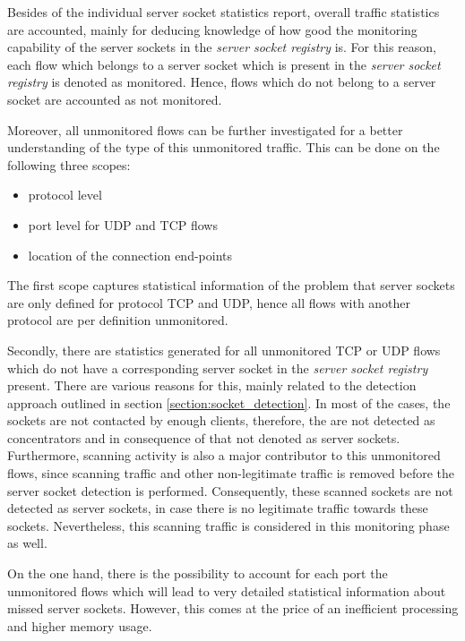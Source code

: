 Besides of the individual \gls{server socket} statistics report, overall traffic 
statistics are accounted, mainly for deducing knowledge of how good the 
monitoring capability of the \glspl{server socket} in the \emph{server socket 
registry} is. For this reason, each flow which belongs to a \gls{server socket} 
which is present in the \emph{server socket registry} is denoted as monitored. 
Hence, flows which do not belong to a \gls{server socket} are accounted as not 
monitored. 

Moreover, all unmonitored flows can be further investigated for a better 
understanding of the type of this unmonitored traffic. This can be done on the 
following three scopes: 
\begin{itemize}
	\item protocol level 
	\item port level for \gls{UDP} and \gls{TCP} flows 
	\item location of the connection end-points 
\end{itemize}

The first scope captures statistical information of the problem that 
\glspl{server socket} are only defined for protocol \gls{TCP} and \gls{UDP}, 
hence all flows with another protocol are per definition unmonitored.

Secondly, there are statistics generated for all unmonitored \gls{TCP} or 
\gls{UDP} flows which do not have a corresponding \gls{server socket} in the 
\emph{server socket registry} present. There are various reasons for this, 
mainly related to the detection approach outlined in section 
\ref{section:socket_detection}. In most of the cases, the sockets are not 
contacted by enough clients, therefore, the are not detected as concentrators 
and in consequence of that not denoted as \glspl{server socket}. Furthermore, 
scanning activity is also a major contributor to this unmonitored flows, since 
scanning traffic and other non-legitimate traffic is removed before the 
\gls{server socket} detection is performed. Consequently, these scanned sockets 
are not detected as \glspl{server socket}, in case there is no legitimate 
traffic towards these sockets. Nevertheless, this scanning traffic is considered 
in this monitoring phase as well. 

On the one hand, there is the possibility to account for each port the 
unmonitored flows which will lead to very detailed statistical information about  
missed \glspl{server socket}. However, this comes at the price of an inefficient 
processing and higher memory usage. 

